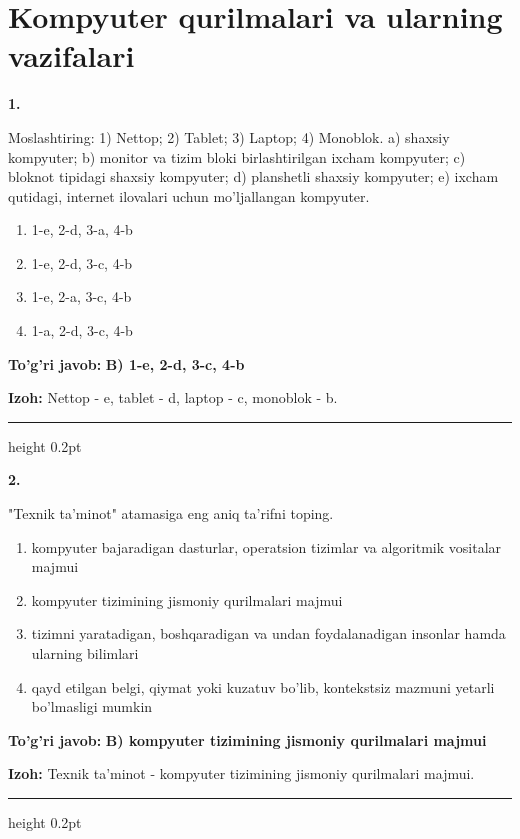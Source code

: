 \documentclass[10pt,a4paper]{article}
\begin{document}
\section{Kompyuter qurilmalari va ularning vazifalari}


{\bfseries\sffamily\color{ink} 1.}
\par
Moslashtiring: 1) Nettop; 2) Tablet; 3) Laptop; 4) Monoblok. a) shaxsiy kompyuter; b) monitor va tizim bloki birlashtirilgan ixcham kompyuter; c) bloknot tipidagi shaxsiy kompyuter; d) planshetli shaxsiy kompyuter; e) ixcham qutidagi, internet ilovalari uchun mo'ljallangan kompyuter.
\begin{enumerate}[label=\Alph*),leftmargin=9mm]
\item 1-e, 2-d, 3-a, 4-b
\item 1-e, 2-d, 3-c, 4-b
\item 1-e, 2-a, 3-c, 4-b
\item 1-a, 2-d, 3-c, 4-b
\end{enumerate}
\begin{tcolorbox}[enhanced,breakable,colback=teal!4,colframe=teal!60!black,boxrule=0.45pt,arc=1.2mm,left=2.7mm,right=2.7mm,top=1.8mm,bottom=1.8mm,before skip=2mm,after skip=2mm]
{\bfseries\sffamily\color{teal}To'g'ri javob:} \textbf{B) 1-e, 2-d, 3-c, 4-b}
\par\smallskip
{\bfseries Izoh:} Nettop - e, tablet - d, laptop - c, monoblok - b.
\end{tcolorbox}
\vspace{2mm}\hrule height 0.2pt\vspace{3mm}

{\bfseries\sffamily\color{ink} 2.}
\par
"Texnik ta'minot" atamasiga eng aniq ta'rifni toping.
\begin{enumerate}[label=\Alph*),leftmargin=9mm]
\item kompyuter bajaradigan dasturlar, operatsion tizimlar va algoritmik vositalar majmui
\item kompyuter tizimining jismoniy qurilmalari majmui
\item tizimni yaratadigan, boshqaradigan va undan foydalanadigan insonlar hamda ularning bilimlari
\item qayd etilgan belgi, qiymat yoki kuzatuv bo'lib, kontekstsiz mazmuni yetarli bo'lmasligi mumkin
\end{enumerate}
\begin{tcolorbox}[enhanced,breakable,colback=teal!4,colframe=teal!60!black,boxrule=0.45pt,arc=1.2mm,left=2.7mm,right=2.7mm,top=1.8mm,bottom=1.8mm,before skip=2mm,after skip=2mm]
{\bfseries\sffamily\color{teal}To'g'ri javob:} \textbf{B) kompyuter tizimining jismoniy qurilmalari majmui}
\par\smallskip
{\bfseries Izoh:} Texnik ta'minot - kompyuter tizimining jismoniy qurilmalari majmui.
\end{tcolorbox}
\vspace{2mm}\hrule height 0.2pt\vspace{3mm}
\end{document}
